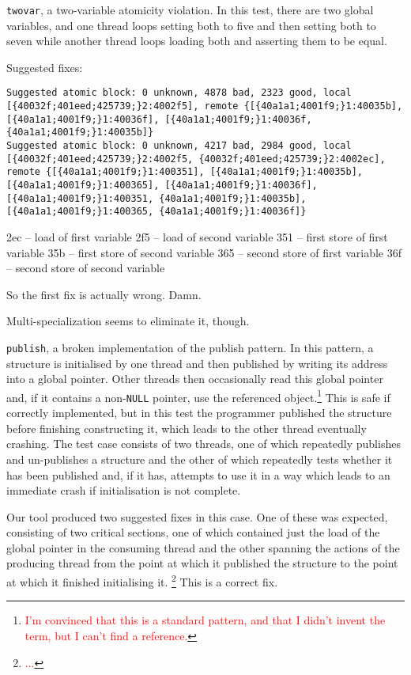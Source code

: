 \documentclass[10pt,twocolumn,preprint,natbib,authoryear]{sigplanconf}
\newcommand{\editorial}[1]{\textcolor{red}{\footnote{\textcolor{red}{#1}}}}
\begin{document}
\verb|twovar|, a two-variable atomicity violation.  In this test,
there are two global variables, and one thread loops setting both to
five and then setting both to seven while another thread loops loading
both and asserting them to be equal.

Suggested fixes:

\begin{verbatim}
Suggested atomic block: 0 unknown, 4878 bad, 2323 good, local [{40032f;401eed;425739;}2:4002f5], remote {[{40a1a1;4001f9;}1:40035b], [{40a1a1;4001f9;}1:40036f], [{40a1a1;4001f9;}1:40036f, {40a1a1;4001f9;}1:40035b]}
Suggested atomic block: 0 unknown, 4217 bad, 2984 good, local [{40032f;401eed;425739;}2:4002f5, {40032f;401eed;425739;}2:4002ec], remote {[{40a1a1;4001f9;}1:400351], [{40a1a1;4001f9;}1:40035b], [{40a1a1;4001f9;}1:400365], [{40a1a1;4001f9;}1:40036f], [{40a1a1;4001f9;}1:400351, {40a1a1;4001f9;}1:40035b], [{40a1a1;4001f9;}1:400365, {40a1a1;4001f9;}1:40036f]}
\end{verbatim}

2ec -- load of first variable
2f5 -- load of second variable
351 -- first store of first variable
35b -- first store of second variable
365 -- second store of first variable
36f -- second store of second variable

So the first fix is actually wrong.  Damn.

Multi-specialization seems to eliminate it, though.


\verb|publish|, a broken implementation of the publish pattern.  In
this pattern, a structure is initialised by one thread and then
published by writing its address into a global pointer.  Other threads
then occasionally read this global pointer and, if it contains a
non-\verb|NULL| pointer, use the referenced object.\editorial{I'm
  convinced that this is a standard pattern, and that I didn't invent
  the term, but I can't find a reference.}  This is safe if correctly
implemented, but in this test the programmer published the structure
before finishing constructing it, which leads to the other thread
eventually crashing.  The test case consists of two threads, one of
which repeatedly publishes and un-publishes a structure and the other
of which repeatedly tests whether it has been published and, if it
has, attempts to use it in a way which leads to an immediate crash if
initialisation is not complete.

Our tool produced two suggested fixes in this case.  One of these was
expected, consisting of two critical sections, one of which contained
just the load of the global pointer in the consuming thread and the
other spanning the actions of the producing thread from the point at
which it published the structure to the point at which it finished
initialising it. \editorial{...}  This is a correct fix.
\end{document}
